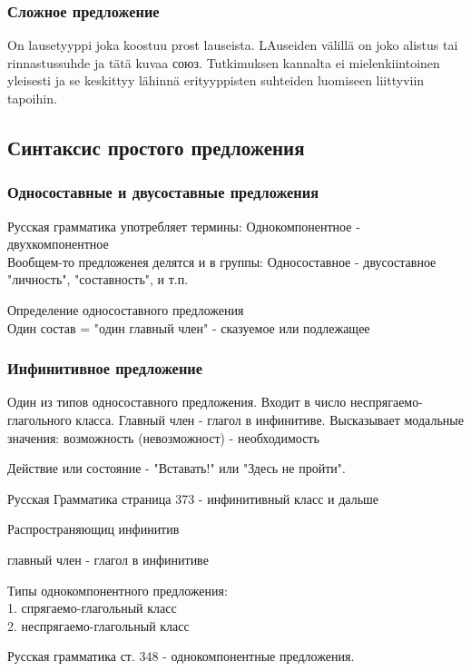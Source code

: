 \subsubsection{Сложное предложение}

On lausetyyppi joka koostuu prost lauseista. LAuseiden välillä on joko alistus tai rinnastussuhde ja tätä kuvaa союз. Tutkimuksen kannalta ei mielenkiintoinen yleisesti ja se keskittyy lähinnä erityyppisten suhteiden luomiseen liittyviin tapoihin. 

\subsection{Синтаксис простого предложения}

\subsubsection{Односоставные и двусоставные предложения}

Русская грамматика употребляет термины:
Однокомпонентное - двухкомпонентное \\

Вообщем-то предложенея делятся и в группы:
Односоставное - двусоставное \\

"личность", "составность", и т.п.


Определение односоставного предложения  \\

Один состав = "один главный член" -  сказуемое или подлежащее

\subsubsection{Инфинитивное предложение}

Один из типов односоставного предложения. Входит в число неспрягаемо-глагольного класса. Главный член - глагол в инфинитиве. Высказывает модальные значения: возможность (невозможност) - необходимость 

Действие или состояние - "Вставать!" или "Здесь не пройти".

Русская Грамматика страница 373 - инфинитивный класс и дальше

Распространяющиц инфинитив

главный член - глагол в инфинитиве

Типы однокомпонентного предложения: \\ 
	1. спрягаемо-глагольный класс \\
	2. неспрягаемо-глагольный класс

Русская грамматика ст. 348 - однокомпонентные предложения.
